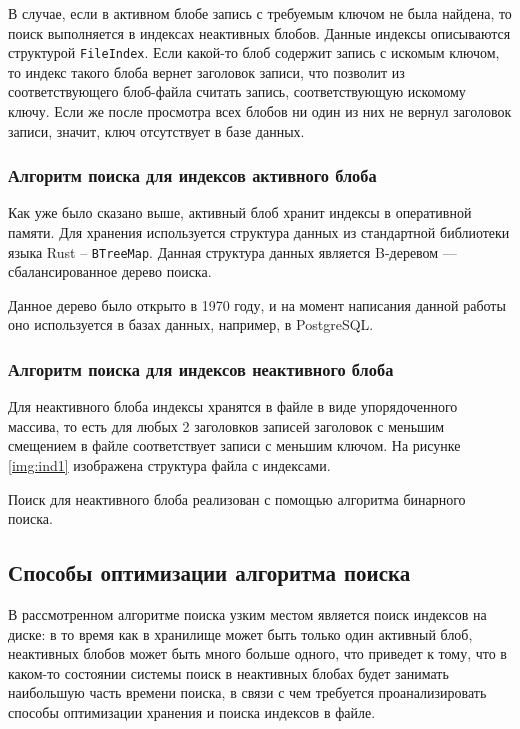 В случае, если в активном блобе запись с требуемым ключом не была найдена, то поиск выполняется в индексах неактивных блобов. Данные индексы описываются структурой \texttt{FileIndex}. Если какой-то блоб содержит запись с искомым ключом, то индекс такого блоба вернет заголовок записи, что позволит из соответствующего блоб-файла считать запись, соответствующую искомому ключу. Если же после просмотра всех блобов ни один из них не вернул заголовок записи, значит, ключ отсутствует в базе данных.

\subsubsection{Алгоритм поиска для индексов активного блоба}

Как уже было сказано выше, активный блоб хранит индексы в оперативной памяти. Для хранения используется структура данных из стандартной библиотеки языка Rust\cite{rust} -- \texttt{BTreeMap}\cite{btreemap}. Данная структура данных является B-деревом\cite{btree} --- сбалансированное дерево поиска. 

 Данное дерево было открыто в 1970 году, и на момент написания данной работы оно используется в базах данных, например, в PostgreSQL\cite{btreepsql}. 

\subsubsection{Алгоритм поиска для индексов неактивного блоба}

Для неактивного блоба индексы хранятся в файле в виде упорядоченного массива, то есть для любых 2 заголовков записей заголовок с меньшим смещением в файле соответствует записи с меньшим ключом. На рисунке \ref{img:ind1} изображена структура файла с индексами.


Поиск для неактивного блоба реализован с помощью алгоритма бинарного поиска\cite{binsearch}.

\subsection{Способы оптимизации алгоритма поиска}

В рассмотренном алгоритме поиска узким местом является поиск индексов на диске: в то время как в хранилище может быть только один активный блоб, неактивных блобов может быть много больше одного, что приведет к тому, что в каком-то состоянии системы поиск в неактивных блобах будет занимать наибольшую часть времени поиска, в связи с чем требуется проанализировать способы оптимизации хранения и поиска индексов в файле.

